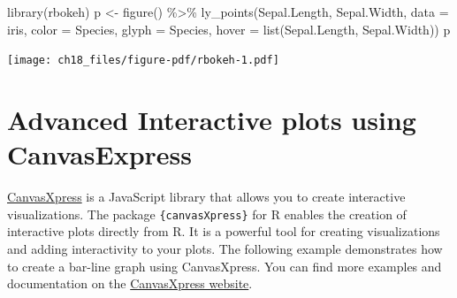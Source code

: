 \documentclass[
  letterpaper,
  DIV=11,
  numbers=noendperiod]{scrreprt}
\newenvironment{Shaded}{\begin{snugshade}}{\end{snugshade}}
\newcommand{\AttributeTok}[1]{\textcolor[rgb]{0.40,0.45,0.13}{#1}}
\newcommand{\FunctionTok}[1]{\textcolor[rgb]{0.28,0.35,0.67}{#1}}
\newcommand{\NormalTok}[1]{\textcolor[rgb]{0.00,0.23,0.31}{#1}}
\newcommand{\OtherTok}[1]{\textcolor[rgb]{0.00,0.23,0.31}{#1}}
\newcommand{\SpecialCharTok}[1]{\textcolor[rgb]{0.37,0.37,0.37}{#1}}
\begin{document}
\begin{Shaded}
\begin{Highlighting}[]
\FunctionTok{library}\NormalTok{(rbokeh)}
\NormalTok{p }\OtherTok{\textless{}{-}} \FunctionTok{figure}\NormalTok{() }\SpecialCharTok{\%\textgreater{}\%}
  \FunctionTok{ly\_points}\NormalTok{(Sepal.Length, Sepal.Width, }\AttributeTok{data =}\NormalTok{ iris,}
    \AttributeTok{color =}\NormalTok{ Species, }\AttributeTok{glyph =}\NormalTok{ Species,}
    \AttributeTok{hover =} \FunctionTok{list}\NormalTok{(Sepal.Length, Sepal.Width))}
\NormalTok{p}
\end{Highlighting}
\end{Shaded}

\texttt{[image: ch18\_files/figure-pdf/rbokeh-1.pdf]}

\section{Advanced Interactive plots using
CanvasExpress}\label{advanced-interactive-plots-using-canvasexpress}

\href{https://www.canvasxpress.org/}{CanvasXpress} is a JavaScript
library that allows you to create interactive visualizations. The
package \texttt{\{canvasXpress\}} for R enables the creation of
interactive plots directly from R. It is a powerful tool for creating
visualizations and adding interactivity to your plots. The following
example demonstrates how to create a bar-line graph using CanvasXpress.
You can find more examples and documentation on the
\href{https://www.canvasxpress.org/}{CanvasXpress website}.
\end{document}
